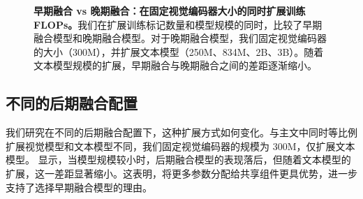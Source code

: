 \begin{figure}[htp]
    \vspace{-4.2cm}
    \caption{\textbf{早期融合 vs 晚期融合：在固定视觉编码器大小的同时扩展训练 FLOPs。}我们在扩展训练标记数量和模型规模的同时，比较了早期融合模型和晚期融合模型。对于晚期融合模型，我们固定视觉编码器的大小（300M），并扩展文本模型（250M、834M、2B、3B）。随着文本模型规模的扩展，早期融合与晚期融合之间的差距逐渐缩小。}
    \label{fig:early_vs_late_scalellmdata_dclm}
\end{figure}\subsection{不同的后期融合配置}
我们研究在不同的后期融合配置下，这种扩展方式如何变化。与主文中同时等比例扩展视觉模型和文本模型不同，我们固定视觉编码器的规模为 300M，仅扩展文本模型。  显示，当模型规模较小时，后期融合模型的表现落后，但随着文本模型的扩展，这一差距显著缩小。这表明，将更多参数分配给共享组件更具优势，进一步支持了选择早期融合模型的理由。

